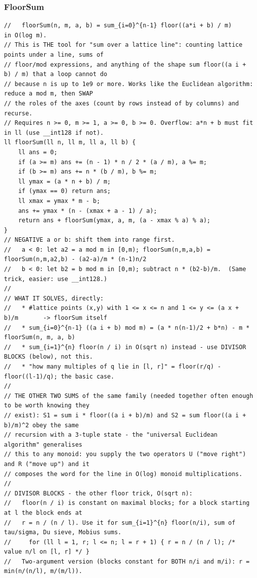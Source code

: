 \documentclass[9pt,a4paper,twocolumn]{extarticle}
\begin{document}
\subsubsection{FloorSum}
\nopagebreak
\begin{lstlisting}
//   floorSum(n, m, a, b) = sum_{i=0}^{n-1} floor((a*i + b) / m)     in O(log m).
// This is THE tool for "sum over a lattice line": counting lattice points under a line, sums of
// floor/mod expressions, and anything of the shape sum floor((a i + b) / m) that a loop cannot do
// because n is up to 1e9 or more. Works like the Euclidean algorithm: reduce a mod m, then SWAP
// the roles of the axes (count by rows instead of by columns) and recurse.
// Requires n >= 0, m >= 1, a >= 0, b >= 0. Overflow: a*n + b must fit in ll (use __int128 if not).
ll floorSum(ll n, ll m, ll a, ll b) {
    ll ans = 0;
    if (a >= m) ans += (n - 1) * n / 2 * (a / m), a %= m;
    if (b >= m) ans += n * (b / m), b %= m;
    ll ymax = (a * n + b) / m;
    if (ymax == 0) return ans;
    ll xmax = ymax * m - b;
    ans += ymax * (n - (xmax + a - 1) / a);
    return ans + floorSum(ymax, a, m, (a - xmax % a) % a);
}
// NEGATIVE a or b: shift them into range first.
//   a < 0: let a2 = a mod m in [0,m); floorSum(n,m,a,b) = floorSum(n,m,a2,b) - (a2-a)/m * (n-1)n/2
//   b < 0: let b2 = b mod m in [0,m); subtract n * (b2-b)/m.  (Same trick, easier: use __int128.)
//
// WHAT IT SOLVES, directly:
//   * #lattice points (x,y) with 1 <= x <= n and 1 <= y <= (a x + b)/m       -> floorSum itself
//   * sum_{i=0}^{n-1} ((a i + b) mod m) = (a * n(n-1)/2 + b*n) - m * floorSum(n, m, a, b)
//   * sum_{i=1}^{n} floor(n / i) in O(sqrt n) instead - use DIVISOR BLOCKS (below), not this.
//   * "how many multiples of q lie in [l, r]" = floor(r/q) - floor((l-1)/q); the basic case.
//
// THE OTHER TWO SUMS of the same family (needed together often enough to be worth knowing they
// exist): S1 = sum i * floor((a i + b)/m) and S2 = sum floor((a i + b)/m)^2 obey the same
// recursion with a 3-tuple state - the "universal Euclidean algorithm" generalises
// this to any monoid: you supply the two operators U ("move right") and R ("move up") and it
// composes the word for the line in O(log) monoid multiplications.
//
// DIVISOR BLOCKS - the other floor trick, O(sqrt n):
//   floor(n / i) is constant on maximal blocks; for a block starting at l the block ends at
//   r = n / (n / l). Use it for sum_{i=1}^{n} floor(n/i), sum of tau/sigma, Du sieve, Mobius sums.
//     for (ll l = 1, r; l <= n; l = r + 1) { r = n / (n / l); /* value n/l on [l, r] */ }
//   Two-argument version (blocks constant for BOTH n/i and m/i): r = min(n/(n/l), m/(m/l)).
\end{lstlisting}
\end{document}
